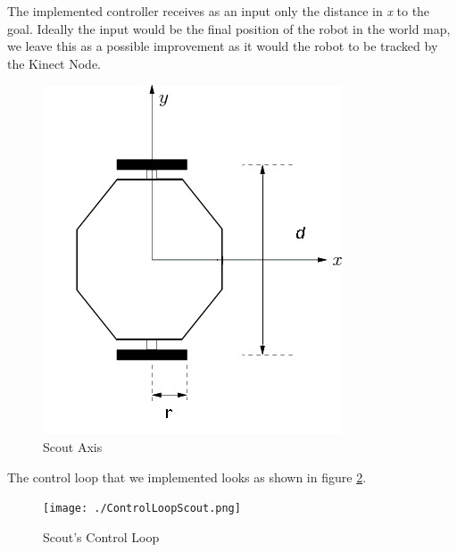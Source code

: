 The implemented controller receives as an input only the distance in \textit{x} to the goal. Ideally the input would be the final position of the robot in the world map, we leave this as a possible improvement as it would the robot to be tracked by the Kinect Node.

\begin{figure}[!h]
    \centering
    \includegraphics[width=0.5\columnwidth]{./ScoutAxis.png}
    \caption{Scout Axis}
    \label{fig:scout_axis}
\end{figure}

The control loop that we implemented looks as shown in figure \ref{fig:scout_loop}.

\begin{figure}[!h]
    \centering
    \texttt{[image: ./ControlLoopScout.png]}
    \caption{Scout's Control Loop}
    \label{fig:scout_loop}
\end{figure}
